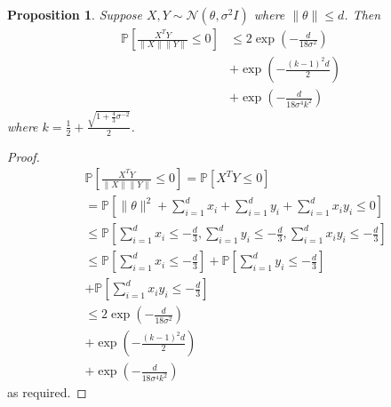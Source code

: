 \documentclass{article}
\theoremstyle{plain}
\newtheorem{proposition}[theorem]{Proposition}
\theoremstyle{definition}
\theoremstyle{remark}
\begin{document}
\begin{proposition}
    Suppose \( X, Y \sim\mathcal{N}(\theta, \sigma^2I) \) where \( \|\theta\|\leq d \). Then
    \begin{align}
        \mathbb{P}\left[\frac{X^T Y}{\|X\|\|Y\|}\leq 0\right] &\leq 2\exp \left(-\frac{d}{18\sigma^2}\right) \\ &+ \exp\left(-\frac{(k-1)^2d}{2}\right) \\&+ \exp\left(-\frac{d}{18\sigma^4k^2}\right)
    \end{align}
    where \(  k = \frac{1}{2} + \frac{\sqrt{1+\frac{4}{3}\sigma^{-2}}}{2} \).
\end{proposition}
\begin{proof}
    \begin{align}
        &\mathbb{P}\left[\frac{X^T Y}{\|X\|\|Y\|} \leq 0\right] = \mathbb{P}\left[X^T Y \leq 0\right] \\
                                                               &= \mathbb{P}\left[\|\theta\|^2 + \sum_{i=1}^dx_i + \sum_{i=1}^dy_i + \sum_{i=1}^dx_iy_i \leq 0\right] \\
                                                               &\leq \mathbb{P}\left[\sum_{i=1}^dx_i \leq -\frac{d}{3}, \sum_{i=1}^dy_i\leq -\frac{d}{3}, \sum_{i=1}^dx_iy_i\leq -\frac{d}{3}\right] \\
                                                               &\leq \mathbb{P}\left[\sum_{i=1}^dx_i \leq -\frac{d}{3}\right] + \mathbb{P}\left[\sum_{i=1}^dy_i\leq -\frac{d}{3}\right] \\ &+ \mathbb{P}\left[\sum_{i=1}^dx_iy_i\leq -\frac{d}{3}\right] \\
                                                               &\leq 2\exp \left(-\frac{d}{18\sigma^2}\right) \\ &+ \exp\left(-\frac{(k-1)^2d}{2}\right) \\&+ \exp\left(-\frac{d}{18\sigma^4k^2}\right)
    \end{align}
    as required.
\end{proof}

\end{document}
